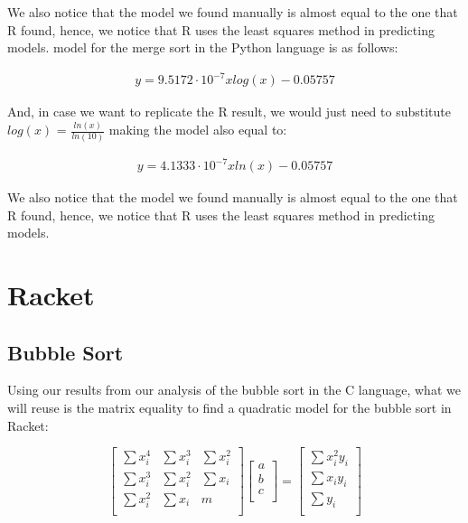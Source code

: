 \documentclass[]{report}
\begin{document}
				We also notice that the model we found manually is almost equal to the one that R found, hence, we notice that R uses the least squares method in predicting models. model for the merge sort in the Python language is as follows:
				
				\begin{ceqn}
					\begin{align}
		 				y = 9.5172\cdot10^{-7}xlog(x) -0.05757
					\end{align}
				\end{ceqn}
				And, in case we want to replicate the R result, we would just need to substitute $log(x)$ = $\frac{ln(x)}{ln(10)}$ making the model also equal to:
				\begin{ceqn}
					\begin{align}
		 				y = 4.1333\cdot10^{-7}xln(x) -0.05757
					\end{align}
				\end{ceqn}
				
				We also notice that the model we found manually is almost equal to the one that R found, hence, we notice that R uses the least squares method in predicting models.
		 		
		 		
		 		
		 		
		    \section{Racket}
		 		\subsection{Bubble Sort}
		 		Using our results from our analysis of the bubble sort in the C language, what we will reuse is the matrix equality to find a quadratic model for the bubble sort in Racket:
		 		
				\begin{equation}
						\begin{bmatrix}
						\sum x_i^4 & \sum x_i^3 & \sum x_i^2 \\
						\sum x_i^3 & \sum x_i^2 & \sum x_i \\
						\sum x_i^2 & \sum x_i & m \\
						\end{bmatrix}
						\begin{bmatrix}
						a \\
						b \\
						c \\
						\end{bmatrix}
						=
						\begin{bmatrix}
						\sum x_i^2y_i \\
						\sum x_iy_i \\
						\sum y_i \\
						\end{bmatrix}
				\end{equation}
				
\end{document}
